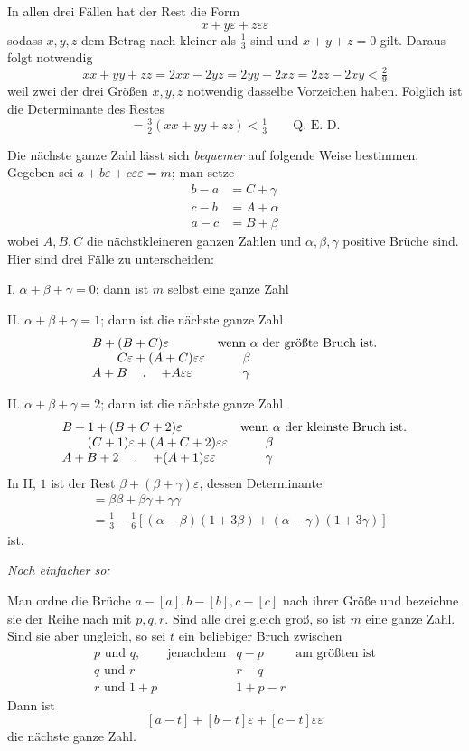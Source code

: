 In allen drei Fällen hat der Rest die Form
\[
x+y\varepsilon+z\varepsilon\varepsilon
\]
sodass $x,y,z$ dem Betrag nach kleiner als $\frac13$ sind und $x+y+z=0$ gilt. Daraus folgt notwendig
\[
xx+yy+zz=2xx-2yz=2yy-2xz=2zz-2xy<\tfrac29
\]
weil zwei der drei Größen $x,y,z$ notwendig dasselbe Vorzeichen haben. Folglich ist die Determinante des Restes
\[
=\tfrac32(xx+yy+zz)<\tfrac13\qquad\text{Q. E. D.}
\]

Die nächste ganze Zahl lässt sich \emph{bequemer} auf folgende Weise bestimmen. Gegeben sei $a+b\varepsilon+c\varepsilon\varepsilon=m$; man setze
\[
\begin{aligned}
b-a&=C+\gamma\\
c-b&=A+\alpha\\
a-c&=B+\beta
\end{aligned}
\]
wobei $A,B,C$ die nächstkleineren ganzen Zahlen und $\alpha,\beta,\gamma$ positive Brüche sind.
Hier sind drei Fälle zu unterscheiden:

%
I. $\alpha+\beta+\gamma=0$; dann ist $m$ selbst eine ganze Zahl

II. $\alpha+\beta+\gamma=1$; dann ist die nächste ganze Zahl
\[
\begin{array}{ll}
B+(B+C)\varepsilon&\text{wenn }\alpha\text{ der größte Bruch ist.}\\
\qquad C\varepsilon+(A+C)\varepsilon\varepsilon&\qquad\beta\\
A+B\quad\mathbin{.}\quad+A\varepsilon\varepsilon&\qquad\gamma
\end{array}
\]

II. $\alpha+\beta+\gamma=2$; dann ist die nächste ganze Zahl
\[
\begin{array}{ll}
B+1+(B+C+2)\varepsilon&\text{wenn }\alpha\text{ der kleinste Bruch ist.}\\
\qquad(C+1)\varepsilon+(A+C+2)\varepsilon\varepsilon&\qquad\beta\\
A+B+2\quad\mathbin{.}\quad+(A+1)\varepsilon\varepsilon&\qquad\gamma
\end{array}
\]
In II, $1$ ist der Rest $\beta+(\beta+\gamma)\varepsilon$, dessen Determinante
\[
\begin{aligned}
&=\beta\beta+\beta\gamma+\gamma\gamma\\
&=\tfrac13-\tfrac16[(\alpha-\beta)(1+3\beta)+(\alpha-\gamma)(1+3\gamma)]
\end{aligned}
\]
ist.

\emph{Noch einfacher so:}

Man ordne die Brüche $a-[a],b-[b],c-[c]$ nach ihrer Größe und bezeichne sie der Reihe nach mit $p,q,r$. Sind alle drei gleich groß, so ist $m$ eine ganze Zahl. Sind sie aber ungleich, so sei $t$ ein beliebiger Bruch zwischen
\[
\begin{array}{llll}
p\text{ und }q,&\text{jenachdem}&q-p&\text{am größten ist}\\
q\text{ und }r&&r-q&\\
r\text{ und }1+p&&1+p-r&
\end{array}
\]
Dann ist
\[
[a-t]+[b-t]\varepsilon+[c-t]\varepsilon\varepsilon
\]
die nächste ganze Zahl.

